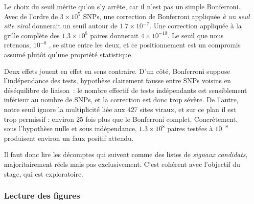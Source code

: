 \documentclass[11pt,a4paper]{article}
\begin{document}
Le choix du seuil mérite qu'on s'y arrête, car il n'est pas un simple Bonferroni. Avec de l'ordre
de $3\times10^{5}$ SNPs, une correction de Bonferroni appliquée \emph{à un seul site viral}
donnerait un seuil autour de $1.7\times10^{-7}$. Une correction appliquée à la grille complète des
$1.3\times10^{8}$ paires donnerait $4\times10^{-10}$. Le seuil que nous retenons, $10^{-8}$ \cite{tuto}, se situe entre
les deux, et ce positionnement est un compromis assumé plutôt qu'une propriété statistique.
 
Deux effets jouent en effet en sens contraire. D'un côté, Bonferroni suppose l'indépendance des
tests, hypothèse clairement fausse entre SNPs voisins en déséquilibre de liaison~: le nombre
effectif de tests indépendants est sensiblement inférieur au nombre de SNPs, et la correction est
donc trop sévère. De l'autre, notre seuil ignore la multiplicité liée aux 427 sites viraux, et
sur ce plan il est trop permissif : environ 25 fois plus que le Bonferroni complet. Concrètement,
sous l'hypothèse nulle et sous indépendance, $1.3\times10^{8}$ paires testées à $10^{-8}$ produisent
environ un faux positif attendu.
 
Il faut donc lire les décomptes qui suivent comme des listes de \emph{signaux candidats},
majoritairement réels mais pas exclusivement. C'est cohérent avec l'objectif du stage, qui est
exploratoire.
 
\subsubsection{Lecture des figures}
\label{sec:grille}
 
\end{document}
